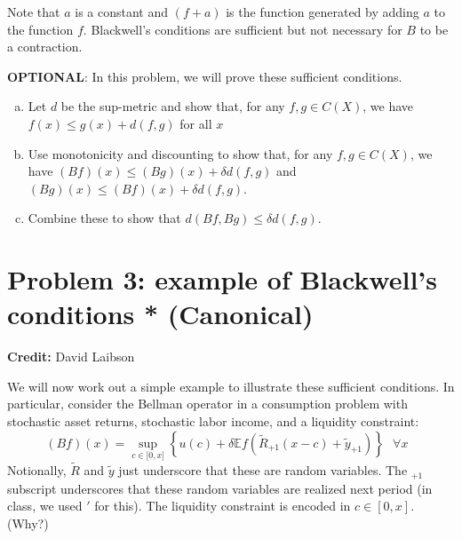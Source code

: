 \documentclass[11pt]{extarticle}
\theoremstyle{plain}
\theoremstyle{definition}
\begin{document}
\noindent
Note that $a$ is a constant and $(f+a)$ is the function generated by adding $a$ to the function $f$. Blackwell's conditions are sufficient but not necessary for $B$ to be a contraction.

\vspace{10mm}
\noindent
\textbf{OPTIONAL}: In this problem, we will prove these sufficient conditions.
\begin{enumerate}[(a)]
\item Let $d$ be the sup-metric and show that, for any $f, g \in C(X)$, we have $f(x) \leq g(x) + d(f, g)$ for all $x$



\item Use monotonicity and discounting to show that, for any $f, g \in C(X)$, we have $(Bf)(x) \leq (Bg)(x) + \delta d(f, g)$ and $(Bg)(x) \leq (Bf)(x) + \delta d(f, g)$. 


\item Combine these to show that $d(Bf, Bg) \leq \delta d(f, g)$. 


\end{enumerate}



\vspace{10mm}
\section*{Problem 3: example of Blackwell's conditions * (Canonical)}

\textbf{Credit:} David Laibson

\vspace{5mm}
\noindent
We will now work out a simple example to illustrate these sufficient conditions. In particular, consider the Bellman operator in a consumption problem with stochastic asset returns, stochastic labor income, and a liquidity constraint:
\begin{equation*}
	(Bf)(x)=\sup_{c\in \lbrack 0,x]}\left\{ u(c)+\delta \mathbb Ef(\tilde{R}_{+1}(x-c)+
	\tilde{y}_{+1})\right\} \text{ \ }\forall x\text{\ } 
\end{equation*}
Notionally, $\tilde R$ and $\tilde y$ just underscore that these are random variables. The $_{+1}$ subscript underscores that these random variables are realized next period (in class, we used $'$ for this). The liquidity constraint is encoded in $c \in [0, x]$. (Why?)
\end{document}
